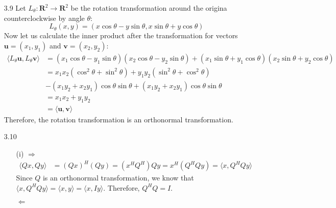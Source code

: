 \documentclass[letterpaper,12pt]{article}
\theoremstyle{definition}
\begin{document}
\begin{enumerate}
      \item[3.9]
        Let $L_\theta: \mathbf{R}^2 \rightarrow \mathbf{R}^2$ be the rotation transformation around the origina counterclockwise by angle $\theta$:
          \begin{equation*}
            L_\theta(x,y) = (x\cos\theta - y\sin\theta, x\sin\theta+y\cos\theta)
          \end{equation*}
          Now let us calculate the inner product after the transformation for vectors $\mathbf{u} = (x_1, y_1)$ and $\mathbf{v} = (x_2, y_2)$:
          \begin{align*}
            \langle L_\theta \mathbf{u},L_\theta \mathbf{v} \rangle &= (x_1\cos\theta - y_1\sin\theta)(x_2\cos\theta - y_2\sin\theta)+ (x_1\sin\theta+y_1\cos\theta)(x_2\sin\theta+y_2\cos\theta) \\
            &= x_1x_2 (\cos^2\theta + \sin^2\theta) + y_1y_2(\sin^2\theta + \cos^2\theta)  \\
            &- (x_1y_2 + x_2y_1)\cos\theta\sin\theta + (x_1y_2 + x_2y_1)\cos\theta\sin\theta \\
            &= x_1x_2 + y_1y_2 \\
            &= \langle \mathbf{u}, \mathbf{v} \rangle
          \end{align*}
          Therefore, the rotation transformation is an orthonormal transformation.

        \item[3.10]
          \begin{enumerate}
            \item[(i)]
              $\Longrightarrow$
              \begin{align*}
                \langle Qx, Qy \rangle &= (Qx)^H(Qy) = (x^H Q^H)Qy = x^H (Q^HQ y) = \langle x,Q^HQy \rangle
              \end{align*}
              Since $Q$ is an orthonormal transformation, we know that $ \langle x,Q^HQy \rangle =\langle x,y \rangle = \langle x,Iy \rangle$. Therefore, $Q^HQ = I$.

              $ \Longleftarrow$


\end{enumerate}
\end{enumerate}
\end{document}
